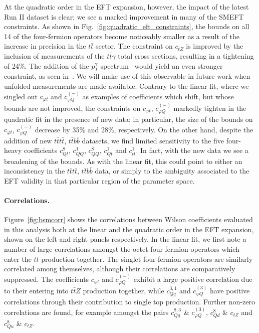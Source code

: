 \documentclass[withindex,glossary]{cam-thesis}
\begin{document}
At the quadratic order in the EFT expansion, however, the impact of the latest Run II dataset is clear;
we see a marked improvement in many of the SMEFT constraints.
As shown in Fig.~\ref{fig:quadratic_eft_constraints}, the bounds on all 14 of the four-fermion operators become noticeably smaller as a result of 
the increase in precision in the $t \bar{t}$ sector.
The constraint on $c_{tZ}$ is improved by the inclusion of
measurements of the $t \bar{t} \gamma$ total cross sections, resulting
in a tightening of 24\%.
The addition of the $p_{T}^{\gamma}$ spectrum~\cite{Aad:2020axn} would
yield an even stronger constraint, as seen in~\cite{Ellis:2020unq}. We will make use of this observable in future work when 
unfolded measurements are made available.
Contrary to the linear fit, where we singled out $c_{\varphi t}$ and $c_{\varphi Q}^{(-)}$ as examples of coefficients which shift, but whose bounds are not improved, the constraints on $c_{\varphi t}$, $c_{\varphi Q}^{(-)}$ markedly tighten in the quadratic fit in the presence of new data; in particular, the size of the bounds on $c_{\varphi t}$, $c_{\varphi Q}^{(-)}$ decrease by 35\% and 28\%, respectively.
On the other hand, despite the addition of new $t\bar{t}t\bar{t}$,
$t\bar{t} b \bar{b}$ datasets, we find limited sensitivity to the five
four-heavy coefficients $c_{Qt}^{8}$, $c_{QQ}^{1}$, $c_{QQ}^{8}$,
$c_{Qt}^{1}$ and $c_{tt}^{1}$. In fact, with the new data we see a
broadening of the bounds. As with the linear fit, this could point to
either an inconsistency in the $t\bar{t}t\bar{t}$, $t\bar{t}b\bar{b}$ data, or
simply to the ambiguity associated to the EFT validity in that
particular region of the parameter space. 

\paragraph{Correlations.}
Figure~\ref{fig:bsmcorr} shows the correlations between Wilson
coefficients evaluated in this analysis both at the linear and the
quadratic order in the EFT expansion, shown on the left and right
panels respectively.
In the linear fit, we first note a number of large correlations amongst the octet four-fermion operators
which enter the $t \bar{t}$ production together.  
The singlet four-fermion operators are similarly correlated among themselves, although 
their correlations are comparatively suppressed.  
The coefficients $c_{\varphi t}$ and $c_{\varphi Q}^{(-)}$
exhibit a large positive correlation due to their
entering into $t \bar{t} Z$ production together,
while $c_{Qq}^{3,1}$ and $c_{\varphi Q}^{(3)}$ have positive
correlations through their contribution to single top production.
Further non-zero correlations are found, for example amongst the pairs $c_{Qq}^{8,3}$ \& $c_{\varphi Q}^{(3)}$,
$c_{Qd}^{8}$ \& $c_{tZ}$ and $c_{Qu}^{8}$ \& $c_{tZ}$.
\end{document}
